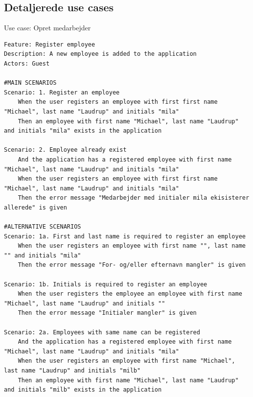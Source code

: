 \subsection{Detaljerede use cases}
\begin{listing}[H]
    \centering
    \caption{Use case: Opret medarbejder}\label{lst:usecase_register_employee}
    \begin{verbatim}  
Feature: Register employee
Description: A new employee is added to the application
Actors: Guest

#MAIN SCENARIOS
Scenario: 1. Register an employee
    When the user registers an employee with first first name "Michael", last name "Laudrup" and initials "mila"
    Then an employee with first name "Michael", last name "Laudrup" and initials "mila" exists in the application

Scenario: 2. Employee already exist
    And the application has a registered employee with first name "Michael", last name "Laudrup" and initials "mila"
    When the user registers an employee with first first name "Michael", last name "Laudrup" and initials "mila"
    Then the error message "Medarbejder med initialer mila ekisisterer allerede" is given

#ALTERNATIVE SCENARIOS
Scenario: 1a. First and last name is required to register an employee
    When the user registers an employee with first name "", last name "" and initials "mila"
    Then the error message "For- og/eller efternavn mangler" is given

Scenario: 1b. Initials is required to register an employee
    When the user registers the employee an employee with first name "Michael", last name "Laudrup" and initials ""
    Then the error message "Initialer mangler" is given

Scenario: 2a. Employees with same name can be registered
    And the application has a registered employee with first name "Michael", last name "Laudrup" and initials "mila"
    When the user registers an employee with first name "Michael", last name "Laudrup" and initials "milb"
    Then an employee with first name "Michael", last name "Laudrup" and initials "milb" exists in the application
    \end{verbatim}
\end{listing}
